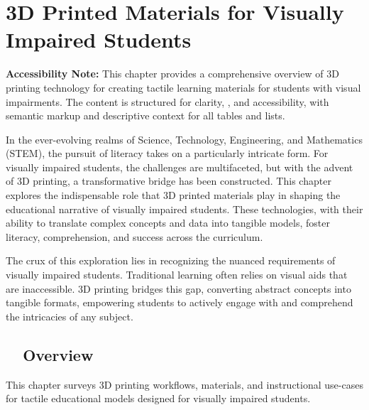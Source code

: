 \chapter{3D Printed Materials for Visually Impaired Students}\label{ch5:3d-printing}

\raggedright

\begin{raggedright}
	\textbf{Accessibility Note:} This chapter provides a comprehensive overview of 3D printing technology for creating tactile learning materials for students with visual impairments. The content is structured for clarity, , and accessibility, with semantic markup and descriptive context for all tables and lists.
\end{raggedright}

In the ever-evolving realms of Science, Technology, Engineering, and Mathematics (STEM), the pursuit of literacy takes on a particularly intricate form. For visually impaired students, the challenges are multifaceted, but with the advent of 3D printing, a transformative bridge has been constructed. This chapter explores the indispensable role that 3D printed materials play in shaping the educational narrative of visually impaired students. These technologies, with their ability to translate complex concepts and data into tangible models, foster literacy, comprehension, and success across the curriculum.\supercite{DassaultEducation, TechLearning2023, TeachThought2021, Karbowski2020}

The crux of this exploration lies in recognizing the nuanced requirements of visually impaired students. Traditional learning often relies on visual aids that are inaccessible. 3D printing bridges this gap, converting abstract concepts into tangible formats, empowering students to actively engage with and comprehend the intricacies of any subject.\supercite{MatterHackers2017, See3D}

\section{~~Overview}\label{chap5:overview}
This chapter surveys 3D printing workflows, materials, and instructional use-cases for tactile educational models designed for visually impaired students.

